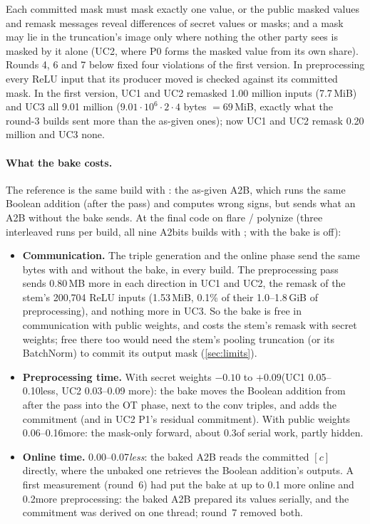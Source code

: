 Each committed mask must mask exactly one value, or the public masked values and remask messages reveal
differences of secret values or masks; and a mask may lie in the truncation's image only where nothing the other party
sees is masked by it alone (UC2, where P0 forms the masked value from its own share).
Rounds 4, 6 and 7 below fixed four violations of the first version. In preprocessing
every ReLU input that its producer moved is checked against its committed mask. In the first version, UC1 and UC2
remasked 1.00 million inputs (7.7\,MiB) and UC3 all 9.01 million ($9.01\cdot 10^6 \cdot 2 \cdot 4$ bytes $= 69$\,MiB,
exactly what the round-3 builds sent more than the as-given ones); now UC1 and UC2 remask 0.20 million and UC3 none.

\paragraph{What the bake costs.} The reference is the same build with : the as-given A2B, which runs
the same Boolean addition (after the pass) and computes wrong signs, but sends what an A2B without the bake sends. At
the final code on flare / polynize (three interleaved runs per build, all nine A2bits builds with ;
with  the bake is off):
\begin{itemize}\itemsep1pt
\item \textbf{Communication.} The triple generation and the online phase send the same bytes with and without the bake,
  in every build. The preprocessing pass sends 0.80\,MB more in each direction in UC1 and UC2, the remask of the
  stem's 200,704 ReLU inputs (1.53\,MiB, 0.1\% of their 1.0--1.8\,GiB of preprocessing), and nothing more in UC3. So
  the bake is free in communication with public weights, and costs the stem's remask with secret weights; free there
  too would need the stem's pooling truncation (or its BatchNorm) to commit its output mask (\cref{sec:limits}).
\item \textbf{Preprocessing time.} With secret weights $-0.10$ to $+0.09$\s (UC1 0.05--0.10\s less, UC2 0.03--0.09\s
  more): the bake moves the Boolean addition from after the pass into the OT phase, next to the conv triples, and adds
  the commitment (and in UC2 P1's residual commitment). With public weights 0.06--0.16\s more: the mask-only forward,
  about 0.3\s of serial work, partly hidden.
\item \textbf{Online time.} 0.00--0.07\s \emph{less}: the baked A2B reads the committed $[c]$ directly, where the
  unbaked one retrieves the Boolean addition's outputs. A first measurement (round~6) had put the bake at up to 0.1\s
  more online and 0.2\s more preprocessing: the baked A2B prepared its values serially, and the commitment was
  derived on one thread; round~7 removed both.
\end{itemize}

